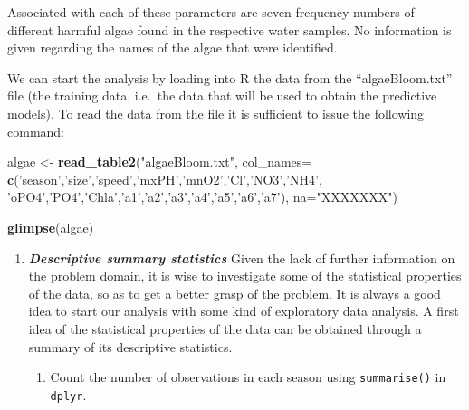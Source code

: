 \documentclass[]{article}
\newenvironment{Shaded}{\begin{snugshade}}{\end{snugshade}}
\newcommand{\KeywordTok}[1]{\textcolor[rgb]{0.13,0.29,0.53}{\textbf{#1}}}
\newcommand{\DataTypeTok}[1]{\textcolor[rgb]{0.13,0.29,0.53}{#1}}
\newcommand{\StringTok}[1]{\textcolor[rgb]{0.31,0.60,0.02}{#1}}
\newcommand{\NormalTok}[1]{#1}
\providecommand{\tightlist}{%
  \setlength{\itemsep}{0pt}\setlength{\parskip}{0pt}}
\begin{document}
Associated with each of these parameters are seven frequency numbers of
different harmful algae found in the respective water samples. No
information is given regarding the names of the algae that were
identified.

We can start the analysis by loading into R the data from the
``algaeBloom.txt'' file (the training data, i.e.~the data that will be
used to obtain the predictive models). To read the data from the file it
is sufficient to issue the following command:

\begin{Shaded}
\begin{Highlighting}[]
\NormalTok{algae <-}\StringTok{ }\KeywordTok{read_table2}\NormalTok{(}\StringTok{"algaeBloom.txt"}\NormalTok{, }\DataTypeTok{col_names=}
                      \KeywordTok{c}\NormalTok{(}\StringTok{'season'}\NormalTok{,}\StringTok{'size'}\NormalTok{,}\StringTok{'speed'}\NormalTok{,}\StringTok{'mxPH'}\NormalTok{,}\StringTok{'mnO2'}\NormalTok{,}\StringTok{'Cl'}\NormalTok{,}\StringTok{'NO3'}\NormalTok{,}\StringTok{'NH4'}\NormalTok{,}
                        \StringTok{'oPO4'}\NormalTok{,}\StringTok{'PO4'}\NormalTok{,}\StringTok{'Chla'}\NormalTok{,}\StringTok{'a1'}\NormalTok{,}\StringTok{'a2'}\NormalTok{,}\StringTok{'a3'}\NormalTok{,}\StringTok{'a4'}\NormalTok{,}\StringTok{'a5'}\NormalTok{,}\StringTok{'a6'}\NormalTok{,}\StringTok{'a7'}\NormalTok{), }
                      \DataTypeTok{na=}\StringTok{"XXXXXXX"}\NormalTok{)}

\KeywordTok{glimpse}\NormalTok{(algae)}
\end{Highlighting}
\end{Shaded}

\begin{enumerate}
\def\labelenumi{\arabic{enumi}.}
\item
  \textbf{\emph{Descriptive summary statistics}} Given the lack of
  further information on the problem domain, it is wise to investigate
  some of the statistical properties of the data, so as to get a better
  grasp of the problem. It is always a good idea to start our analysis
  with some kind of exploratory data analysis. A first idea of the
  statistical properties of the data can be obtained through a summary
  of its descriptive statistics.

  \begin{enumerate}
  \tightlist
  \item
    Count the number of observations in each season using
    \texttt{summarise()} in \texttt{dplyr}.
  \end{enumerate}
\end{enumerate}
\end{document}
